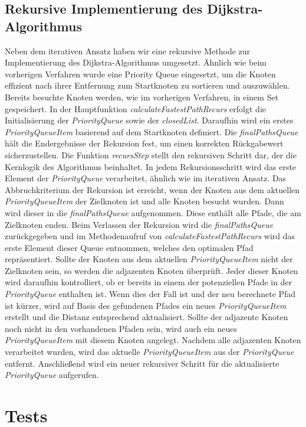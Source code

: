 \documentclass[a4paper]{article}
\begin{document}
\subsection{Rekursive Implementierung des Dijkstra-Algorithmus}
Neben dem iterativen Ansatz haben wir eine rekursive Methode zur Implementierung des Dijkstra-Algorithmus umgesetzt. Ähnlich wie beim vorherigen Verfahren wurde eine Priority Queue eingesetzt, um die Knoten effizient nach ihrer Entfernung zum Startknoten zu sortieren und auszuwählen. Bereits besuchte Knoten werden, wie im vorherigen Verfahren, in einem Set gespeichert. 
In der Hauptfunktion \textit{calculateFastestPathRecurs} erfolgt die Initialisierung der \textit{PriorityQueue} sowie der \textit{closedList}. Daraufhin wird ein erstes \textit{PriorityQueueItem} basierend auf dem Startknoten definiert. Die \textit{finalPathsQueue} hält die Endergebnisse der Rekursion fest, um einen korrekten Rückgabewert sicherzustellen.
Die Funktion \textit{recursStep} stellt den rekursiven Schritt dar, der die Kernlogik des Algorithmus beinhaltet. In jedem Rekursionsschritt wird das erste Element der \textit{PriorityQueue} verarbeitet, ähnlich wie im iterativen Ansatz. Das Abbruchkriterium der Rekursion ist erreicht, wenn der Knoten aus dem aktuellen \textit{PriorityQueueItem} der Zielknoten ist und alle Knoten besucht wurden. Dann wird dieser in die \textit{finalPathsQueue} aufgenommen. Diese enthält alle Pfade, die am Zielknoten enden. Beim Verlassen der Rekursion wird die \textit{finalPathsQueue} zurückgegeben und im Methodenaufruf von \textit{calculateFastestPathRecurs} wird das erste Element dieser Queue entnommen, welches den optimalen Pfad repräsentiert.
Sollte der Knoten aus dem aktuellen \textit{PriorityQueueItem} nicht der Zielknoten sein, so werden die adjazenten Knoten überprüft. Jeder dieser Knoten wird daraufhin kontrolliert, ob er bereits in einem der potenziellen Pfade in der \textit{PriorityQueue} enthalten ist. Wenn dies der Fall ist und der neu berechnete Pfad ist kürzer, wird auf Basis des gefundenen Pfades ein neues \textit{PriorityQueueItem} erstellt und die Distanz entsprechend aktualisiert. Sollte der adjazente Knoten noch nicht in den vorhandenen Pfaden sein, wird auch ein neues \textit{PriorityQueueItem} mit diesem Knoten angelegt.
Nachdem alle adjazenten Knoten verarbeitet wurden, wird das aktuelle \textit{PriorityQueueItem} aus der \textit{PriorityQueue} entfernt. Anschließend wird ein neuer rekursiver Schritt für die aktualisierte \textit{PriorityQueue} aufgerufen.

\section{Tests}
\end{document}
